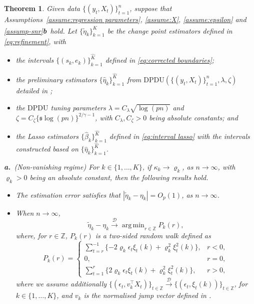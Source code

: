 \documentclass[11pt]{article}
\DeclareMathOperator*{\argmin}{arg\,min}
\newcommand{\s}{ { \mathfrak{s}  } }
\theoremstyle{plain}
\newtheorem{theorem}{Theorem}
\theoremstyle{definition}
\begin{document}
\begin{theorem}\label{thm:asymptotics}
Given data $\{(y_t, X_t)\}_{t = 1}^n$, suppose that Assumptions~\ref{assume:regression parameters}, \ref{assume:X}, \ref{assume:epsilon} and \ref{assump-snr}\textbf{b}~hold.  Let $\{\widetilde{\eta}_k\}_{k = 1}^{\widehat{K}}$ be the change point estimators defined in \eqref{eq:refinement}, with 
\begin{itemize}
    \item the intervals $\{(s_k, e_k)\}_{k = 1}^{\widehat{K}}$ defined in \eqref{eq:corrected boundaries};
    \item the preliminary estimators $\{\widehat{\eta}_k\}_{k = 1}^{\widehat{K}}$ from $\mathrm{DPDU}(\{(y_t, X_t)\}_{t = 1}^n, \lambda, \zeta)$ detailed in ;
    \item the $\mathrm{DPDU}$ tuning parameters $\lambda = C_\lambda \sqrt{\log(pn)}$ and $\zeta = C_\zeta\{\s \log(pn)\}^{2/\gamma - 1}$, with $C_{\lambda}, C_{\zeta} > 0$ being absolute constants; and
    \item the Lasso estimators $\{\widehat{\beta}_k\}_{k = 1}^{\widehat{K}}$ defined in \eqref{eq:interval lasso} with the intervals constructed based on $\{\widehat{\eta}_k\}_{k = 1}^{\widehat{K}}$.
\end{itemize}

\noindent \textbf{a.}~(Non-vanishing regime)  For $k \in \{1, \ldots, K\}$, if $\kappa_k \to \varrho_k$, as $n \to \infty$, with $\varrho_k > 0$ being an absolute constant, then the following results hold.
    \begin{itemize}
        \item [\textbf{a.1.}] The estimation error satisfies that $|\widetilde{\eta}_k - \eta_k| = O_p(1)$, as $n \to \infty$.
        \item [\textbf{a.2.}] When $n \to \infty$, 
        \[
            \widetilde{\eta}_k - \eta_k \overset{\mathcal{D}}{\longrightarrow} \argmin_{r \in \mathbb{Z}} P_k(r),
        \]
        where, for $r \in \mathbb{Z}$, $P_k(r)$ is a two-sided random walk defined as 
        \[
            P_k(r) = \begin{cases}
                \sum_{t = r}^{-1} \{-2\varrho_k\epsilon_t\xi_t(k) + \varrho_k^2\xi^2_t(k)\}, & r < 0,\\
                0, & r = 0,\\
                \sum_{t = 1}^r \{2\varrho_k\epsilon_t\xi_t(k) + \varrho_k^2\xi^2_t(k)\}, & r > 0,
                \end{cases}
        \]
        where we assume additionally $\{(\epsilon_t, v_k^{\top}X_t)\}_{t \in \mathbb Z} \overset{\mathcal{D}}{\longrightarrow} \{(\epsilon_t, \xi_t(k))\}_{t \in \mathbb Z}$, for $k \in \{1, \dots, K\}$, and $v_k$ is the normalised jump vector defined in .
    \end{itemize}


\end{theorem}
\end{document}

